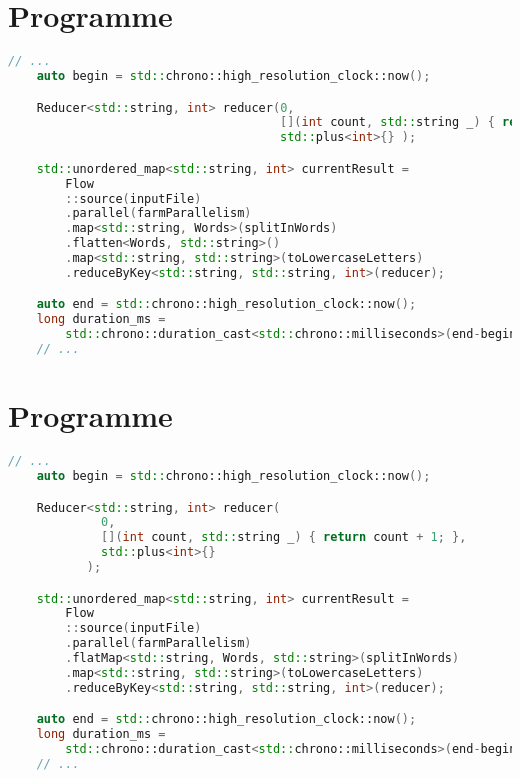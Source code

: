 \newpage
\section{Programme }
\label{appendice-code-wordcount-s.ann}
\begin{lstlisting}[gobble=4,basicstyle=\ttfamily\footnotesize,language=c++]
	// ...
    auto begin = std::chrono::high_resolution_clock::now();

    Reducer<std::string, int> reducer(0, 
                                      [](int count, std::string _) { return count + 1; },
                                      std::plus<int>{} );

    std::unordered_map<std::string, int> currentResult = 
        Flow
        ::source(inputFile)
        .parallel(farmParallelism)
        .map<std::string, Words>(splitInWords)			
        .flatten<Words, std::string>()			
        .map<std::string, std::string>(toLowercaseLetters)			
        .reduceByKey<std::string, std::string, int>(reducer);  

    auto end = std::chrono::high_resolution_clock::now();
    long duration_ms = 
        std::chrono::duration_cast<std::chrono::milliseconds>(end-begin).count();
	// ...
\end{lstlisting}

\newpage
\section{Programme }
\begin{lstlisting}[gobble=4,basicstyle=\ttfamily\footnotesize,language=c++]
    // ...
    auto begin = std::chrono::high_resolution_clock::now();

    Reducer<std::string, int> reducer(
             0, 
             [](int count, std::string _) { return count + 1; },
             std::plus<int>{}
           );

    std::unordered_map<std::string, int> currentResult = 
        Flow
        ::source(inputFile)
        .parallel(farmParallelism)
        .flatMap<std::string, Words, std::string>(splitInWords)			
        .map<std::string, std::string>(toLowercaseLetters)			
        .reduceByKey<std::string, std::string, int>(reducer);  

    auto end = std::chrono::high_resolution_clock::now();
    long duration_ms = 
        std::chrono::duration_cast<std::chrono::milliseconds>(end-begin).count();
    // ...
\end{lstlisting}

